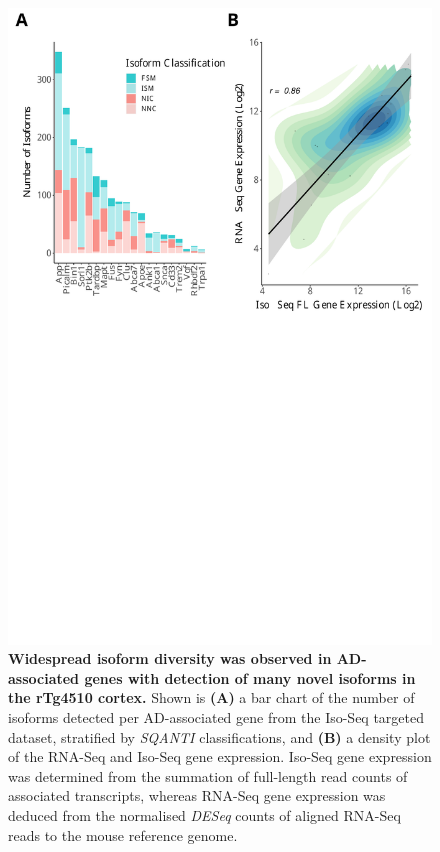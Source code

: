 \begin{figure}[!htp]
	\begin{center}
		\includegraphics[page=1,trim={0 20cm 0 0cm},clip,scale = 0.60]{Figures/ONTvsIsoSeq.pdf}
	\end{center}
	\captionsetup{width=0.95\textwidth}
	\caption[Isoform landscape of AD-associated genes from Iso-Seq targeted profiling]%
	{\textbf{Widespread isoform diversity was observed in AD-associated genes with detection of many novel isoforms in the rTg4510 cortex.} Shown is \textbf{(A)} a bar chart of the number of isoforms detected per AD-associated gene from the Iso-Seq targeted dataset, stratified by \textit{SQANTI} classifications, and \textbf{(B)} a density plot of the RNA-Seq and Iso-Seq gene expression. Iso-Seq gene expression was determined from the summation of full-length read counts of associated transcripts, whereas RNA-Seq gene expression was deduced from the normalised \textit{DESeq} counts of aligned RNA-Seq reads to the mouse reference genome\cite{Castanho2020}.}
	\label{fig:isoseq_targeted_finalnumberiso}
\end{figure}


